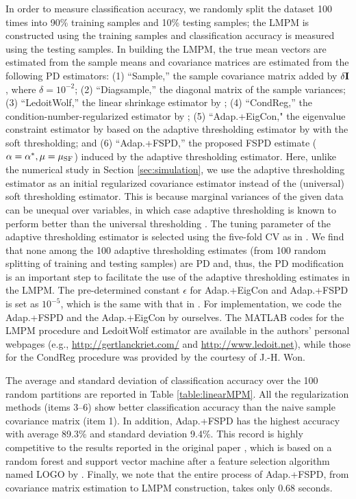 \documentclass[times,sort&compress,3p]{elsarticle}
\begin{document}
\color{black}
In order to measure classification accuracy, we randomly split the dataset 100 times into 90\% training samples and 10\% testing samples;
the LMPM is
constructed using the training samples and classification accuracy is measured using the testing samples.
In building the LMPM, the true mean vectors are
estimated from the sample means and covariance matrices are estimated from the following PD estimators:
(1) ``Sample,'' the sample covariance matrix added by $\delta {\bf I}$, where $\delta = 10^{-2}$;
 (2) ``Diagsample,'' the diagonal matrix of the sample variances;
 (3) ``LedoitWolf,'' the linear shrinkage estimator by \citet{Ledoit2004};
 (4) ``CondReg,'' the condition-number-regularized estimator by \citet{Won2013};
 (5) ``Adap.+EigCon," the eigenvalue constraint estimator by \citet{Xue2012} based on the adaptive thresholding
 estimator by \citet{Cai2011b} with the soft thresholding;
 and (6) ``Adap.+FSPD,'' the proposed FSPD estimate ($\alpha=\alpha^*, \mu=\mu_{\rm SF}$) induced by the adaptive
 thresholding estimator. Here,
 unlike the numerical study in Section \ref{sec:simulation}, we use the adaptive thresholding estimator as an initial
 regularized covariance estimator
 instead of the (universal) soft thresholding estimator. This is because marginal variances of the given data can
 be unequal over variables, in which case adaptive thresholding is known to perform better than the universal
 thresholding \citep{Cai2011b}. The tuning parameter of the adaptive thresholding estimator is selected using
 the five-fold CV as in \citet{Cai2011b}.  We find that none among the 100 adaptive thresholding 
 estimates (from 100 random splitting of training and testing samples) are PD and, thus, the PD modification 
 is an important step to  facilitate the use of the adaptive thresholding estimates in the LMPM.
 The pre-determined constant $\epsilon$ for Adap.+EigCon and Adap.+FSPD is
 set as  $10^{-5}$, which is the same with that in \citet{Xue2012}.  For implementation, we code the Adap.+FSPD and the Adap.+EigCon by ourselves. 
 The \textsf{MATLAB} codes for the LMPM procedure and LedoitWolf estimator are available in the authors' personal webpages (e.g., \url{http://gertlanckriet.com/} and \url{http://www.ledoit.net}), 
 while those for the CondReg procedure was provided by the courtesy of J.-H. Won.


The average and standard deviation of classification accuracy over the 100 random partitions are
 reported in Table \ref{table:linearMPM}. All the regularization methods (items 3--6) show
better classification accuracy than the naive sample covariance matrix (item 1). In addition, Adap.+FSPD has the highest
accuracy with
average 89.3\% and standard deviation 9.4\%. This record is highly competitive to the results
reported in the original paper
\citep{Tsanas2014}, which is based on a random forest and support vector machine after a feature selection algorithm named
LOGO by \citet{Sun2010}.
Finally, we note that the entire process of Adap.+FSPD, from covariance matrix estimation to LMPM construction, takes
only 0.68 seconds.
\end{document}
